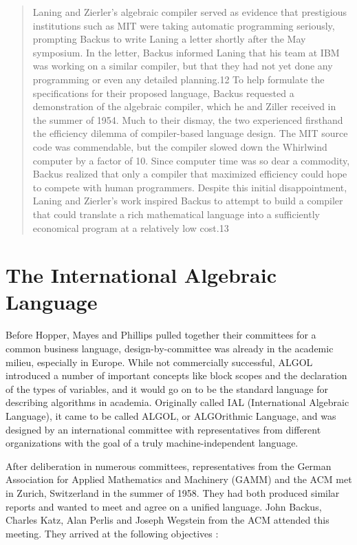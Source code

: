 \begin{quotation}
Laning and Zierler's algebraic compiler served as evidence that prestigious
institutions such as MIT were taking automatic programming
seriously, prompting
Backus to write Laning a letter shortly after the May symposium.
In the letter,
Backus informed Laning that his team at IBM was working on a
similar compiler,
but that they had not yet done any programming or even any
detailed planning.12
To help formulate the specifications for their proposed language, Backus
requested a demonstration of the algebraic compiler, which he and Ziller
received in the summer of 1954. Much to their dismay, the two
experienced firsthand the efficiency dilemma of compiler-based
language design. The MIT
source code was commendable, but the compiler slowed down the Whirlwind
computer by a factor of 10. Since computer time was so dear a
commodity, Backus
realized that only a compiler that maximized efficiency could
hope to compete
with human programmers. Despite this initial disappointment, Laning and
Zierler's work inspired Backus to attempt to build a compiler that could
translate a rich mathematical language into a sufficiently
economical program
at a relatively low cost.13
\cite{grace_hopper_and_the_invention_of_the_information_age_2009}
\end{quotation}

\section{The International Algebraic Language}

Before Hopper, Mayes and Phillips pulled together their committees for a common
business language, design-by-committee was already in the academic milieu,
especially in Europe.
While not commercially successful, ALGOL introduced a number of important concepts
like block scopes and the declaration of the types of variables, and it would
go on to be the standard language for describing algorithms in academia.
Originally called IAL (International Algebraic Language), it came to be called
ALGOL, or ALGOrithmic Language, and was designed by an international committee
with representatives from different organizations with the goal of a truly
machine-independent language.

After deliberation in numerous committees, representatives from the German
Association for Applied Mathematics and Machinery (GAMM) and the ACM met in
Zurich, Switzerland in the summer of 1958. They had both produced similar
reports and wanted to meet and agree on a unified language.
John Backus, Charles Katz, Alan Perlis and Joseph Wegstein from the ACM attended this meeting.
They arrived at the following objectives
\cite{perlis_samelson_1958_preliminary_report_ial}:

